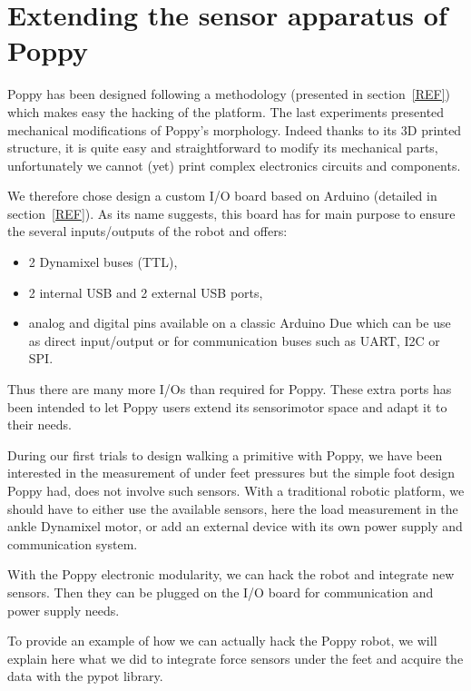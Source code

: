 
\newpage
\section{Extending the sensor apparatus of Poppy} %
\label{sec:morphology-adding-mechanism}

Poppy has been designed following a methodology (presented in section~\ref{REF}) which makes easy the hacking of the platform.
The last experiments presented mechanical modifications of Poppy's morphology. Indeed thanks to its 3D printed structure, it is quite easy and straightforward to modify its mechanical parts, unfortunately we cannot (yet) print complex electronics circuits and components.

We therefore chose design a custom I/O board based on Arduino (detailed in section~\ref{REF}). As its name suggests, this board has for main purpose to ensure the several inputs/outputs of the robot and offers:
\begin{itemize}
    \item 2 Dynamixel buses (TTL),
    \item 2 internal USB and 2 external USB ports,
    \item analog and digital pins available on a classic Arduino Due which can be use as direct input/output or for communication buses such as UART, I2C or SPI.
\end{itemize}
Thus there are many more I/Os than required for Poppy. These extra ports has been intended to let Poppy users extend its sensorimotor space and adapt it to their needs.


During our first trials to design walking a primitive with Poppy, we have been interested in the measurement of under feet pressures but the simple foot design Poppy had, does not involve such sensors. With a traditional robotic platform, we should have to either use the available sensors, here the load measurement in the ankle Dynamixel motor, or add an external device with its own power supply and communication system.

With the Poppy electronic modularity, we can hack the robot and integrate new sensors. Then they can be plugged on the I/O board for communication and power supply needs.

To provide an example of how we can actually hack the Poppy robot, we will explain here what we did to integrate force sensors under the feet and acquire the data with the pypot library.


